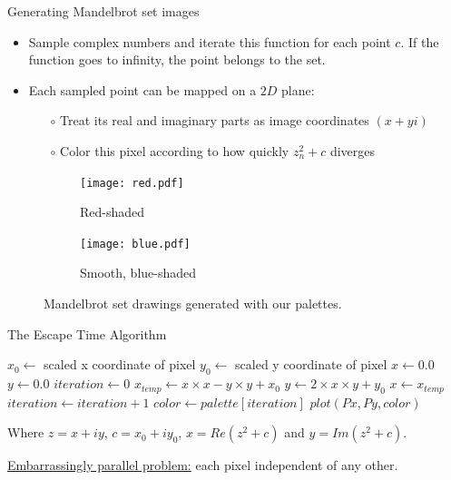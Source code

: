 \documentclass[10pt]{beamer}
\begin{document}
\begin{frame}[fragile]{Generating Mandelbrot set images}

\begin{itemize}
	\item Sample complex numbers and iterate this function for each point $c$.
	If the function goes to infinity, the point belongs to the set.	\\[7pt]
	\item Each sampled point can be mapped on a $2D$ plane:
	\begin{itemize}
		\item[$\circ$] Treat its real and imaginary parts as image coordinates $(x+yi)$ 
		\item[$\circ$] Color this pixel according to how quickly $z_{n}^2 + c$ diverges
	\end{itemize}
\end{itemize}
\vfill
\begin{figure}[b]
	\vspace{-0.0cm}
	\centering
	\begin{subfigure}{.45\textwidth}
		\centering
		\texttt{[image: red.pdf]}
		\caption{Red-shaded}
		\label{fig:mandelbrot-red}
	\end{subfigure}%
	\begin{subfigure}{.45\textwidth}
		\centering
		\texttt{[image: blue.pdf]}
		\caption{Smooth, blue-shaded}
		\label{fig:mandelbrot-blue}
	\end{subfigure}
	\vspace{-0.5cm}
	\caption{Mandelbrot set drawings generated with our palettes.}
	\label{fig:both-mandelbrot}
\end{figure}

\end{frame}

\begin{frame}[fragile]{The Escape Time Algorithm}
	
\begin{algorithm}[H]
	\footnotesize
	\caption{Escape Time algorithm}\label{euclid}
	\begin{algorithmic}[1]
		\State $x_0 \gets$ scaled x coordinate of pixel
		\State $y_0 \gets$ scaled y coordinate of pixel
		\State $x \gets 0.0$
		\State $y \gets 0.0$
		\State $iteration \gets 0$
		\State $x_{temp} \gets x\times x - y\times y + x_0$
		\State $y \gets 2\times x\times y + y_0$
		\State $x \gets x_{temp}$
		\State $iteration \gets iteration + 1$
		\EndWhile
		\State $color \gets palette[iteration]$
		\State $plot(Px, Py, color)$
		\EndFor
	\end{algorithmic}
\end{algorithm}
\vspace{-0.7cm}
{\footnotesize Where $z = x + iy$, $c = x_0 + iy_0$, $x = Re(z^2+c)$ and $y=Im(z^2+c)$.}

\underline{Embarrassingly parallel problem:} each pixel independent of any other.
\end{frame}
\end{document}
